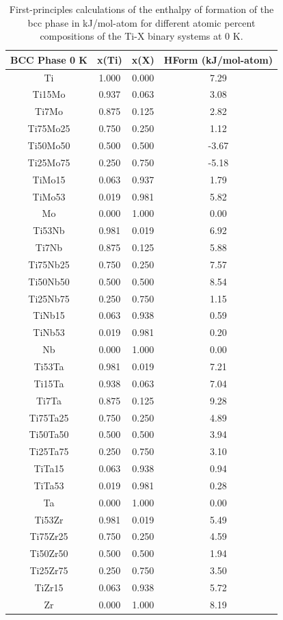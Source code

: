 \newpage
\begin{longtable}[H]{ c c c c }
	\caption{First-principles calculations of the enthalpy of formation of the bcc phase in kJ/mol-atom for different atomic percent compositions of the Ti-X binary systems at 0 K.} 	\label{Ch3-table:hof} \\
		\hline
		BCC Phase 0 K & x(Ti) & x(X) & HForm (kJ/mol-atom)\\
		\hline
        \endhead
        \hline
        \endfoot
		Ti & 1.000 & 0.000 & 7.29\\
		Ti15Mo & 0.937 & 0.063 & 3.08\\
		Ti7Mo & 0.875 & 0.125 & 2.82\\
		Ti75Mo25 & 0.750 & 0.250 & 1.12\\
		Ti50Mo50 & 0.500 & 0.500 & -3.67\\
		Ti25Mo75 & 0.250 & 0.750 & -5.18\\
		TiMo15 & 0.063 & 0.937 & 1.79\\
		TiMo53 & 0.019 & 0.981 & 5.82\\
		Mo & 0.000 & 1.000 & 0.00\\
		Ti53Nb & 0.981 & 0.019 & 6.92\\
		Ti7Nb & 0.875 & 0.125 & 5.88\\ 
		Ti75Nb25 & 0.750 & 0.250 & 7.57\\
		Ti50Nb50 & 0.500 & 0.500 & 8.54\\
		Ti25Nb75 & 0.250 & 0.750 & 1.15\\
		TiNb15 & 0.063 & 0.938 & 0.59\\
		TiNb53 & 0.019 & 0.981 & 0.20\\
		Nb & 0.000 & 1.000 & 0.00\\
		Ti53Ta & 0.981 & 0.019 & 7.21\\
		Ti15Ta & 0.938 & 0.063 & 7.04\\
		Ti7Ta & 0.875 & 0.125 & 9.28\\
		Ti75Ta25 & 0.750 & 0.250 & 4.89\\
		Ti50Ta50 & 0.500 & 0.500 & 3.94\\
		Ti25Ta75 & 0.250 & 0.750 & 3.10\\
		TiTa15 & 0.063 & 0.938 & 0.94\\
		TiTa53 & 0.019 & 0.981 & 0.28\\
		Ta & 0.000 & 1.000 & 0.00\\
		Ti53Zr & 0.981 & 0.019 & 5.49\\
		Ti75Zr25 & 0.750 & 0.250 & 4.59\\
		Ti50Zr50 & 0.500 & 0.500 & 1.94\\
		Ti25Zr75 & 0.250 & 0.750 & 3.50\\
		TiZr15 & 0.063 & 0.938 & 5.72\\
		Zr & 0.000 & 1.000 & 8.19\\
		\hline
\end{longtable}

